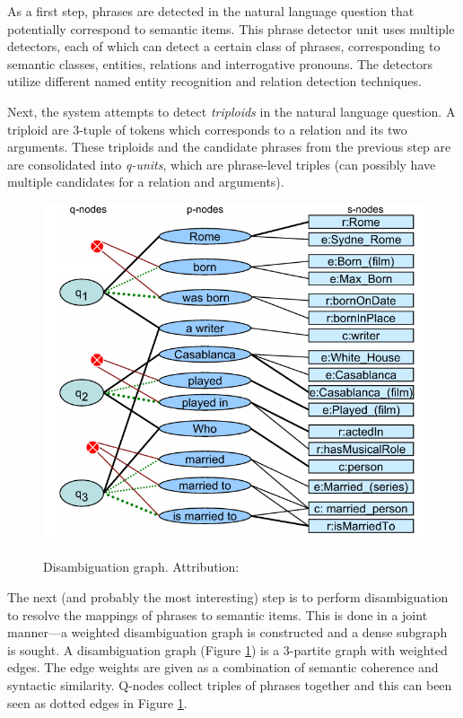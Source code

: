 \documentclass[a4paper, twoside, 12pt]{report}
\begin{document}
As a first step, phrases are detected in the natural language question that potentially correspond to semantic items. This phrase detector unit uses multiple detectors, each of which can detect a certain class of phrases, corresponding to semantic classes, entities, relations and interrogative pronouns. The detectors utilize different named entity recognition and relation detection techniques.

Next, the system attempts to detect \emph{triploids} in the natural language question. A triploid are 3-tuple of tokens which corresponds to a relation and its two arguments. These triploids and the candidate phrases from the previous step are are consolidated into \emph{q-units}, which are phrase-level triples (can possibly have multiple candidates for a relation and arguments).

\begin{figure}
  \center
  \includegraphics[scale=0.5]{./deanna1.png}
  \label{fig:disgraph}
  \caption{Disambiguation graph. Attribution: \cite{yahya2012deep}}
\end{figure}

The next (and probably the most interesting) step is to perform disambiguation to resolve the mappings of phrases to semantic items. This is done in a joint manner---a weighted disambiguation graph is constructed and a dense subgraph is sought. A disambiguation graph (Figure \ref{fig:disgraph}) is a 3-partite graph with weighted edges. The edge weights are given as a combination of semantic coherence and syntactic similarity. Q-nodes collect triples of phrases together and this can been seen as dotted edges in Figure \ref{fig:disgraph}. 
\end{document}
